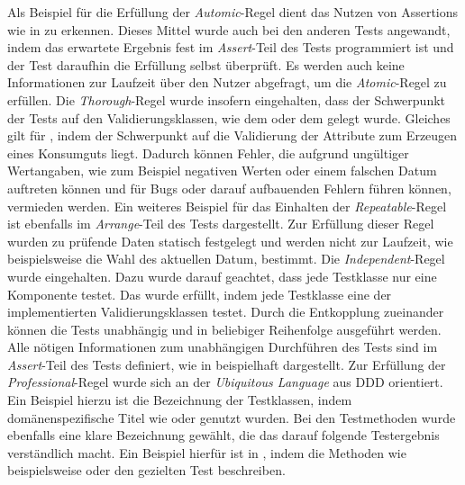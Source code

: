 Als Beispiel für die Erfüllung der \textit{Automic}-Regel dient das Nutzen von Assertions wie in \href{}{} zu erkennen.
Dieses Mittel wurde auch bei den anderen Tests angewandt, indem das erwartete Ergebnis fest im \textit{Assert}-Teil des Tests programmiert ist und der Test daraufhin die Erfüllung selbst überprüft.
Es werden auch keine Informationen zur Laufzeit über den Nutzer abgefragt, um die \textit{Atomic}-Regel zu erfüllen.
Die \textit{Thorough}-Regel wurde insofern eingehalten, dass der Schwerpunkt der Tests auf den Validierungsklassen, wie dem \href{}{} oder dem \href{}{} gelegt wurde.
Gleiches gilt für \href{}{}, indem der Schwerpunkt auf die Validierung der Attribute zum Erzeugen eines Konsumguts liegt.
Dadurch können Fehler, die aufgrund ungültiger Wertangaben, wie zum Beispiel negativen Werten oder einem falschen Datum auftreten können und für Bugs oder darauf aufbauenden Fehlern führen können, vermieden werden.
Ein weiteres Beispiel für das Einhalten der \textit{Repeatable}-Regel ist ebenfalls im \textit{Arrange}-Teil des Tests \href{}{} dargestellt.
Zur Erfüllung dieser Regel wurden zu prüfende Daten statisch festgelegt und werden nicht zur Laufzeit, wie beispielsweise die Wahl des aktuellen Datum, bestimmt.
Die \textit{Independent}-Regel wurde eingehalten. Dazu wurde darauf geachtet, dass jede Testklasse nur eine Komponente testet.
Das wurde erfüllt, indem jede Testklasse eine der implementierten Validierungsklassen testet.
Durch die Entkopplung zueinander können die Tests unabhängig und in beliebiger Reihenfolge ausgeführt werden.
Alle nötigen Informationen zum unabhängigen Durchführen des Tests sind im \textit{Assert}-Teil des Tests definiert, wie in \href{}{} beispielhaft dargestellt.
Zur Erfüllung der \textit{Professional}-Regel wurde sich an der \textit{Ubiquitous Language} aus \ac{DDD} orientiert. Ein Beispiel hierzu ist die Bezeichnung der Testklassen, indem domänenspezifische Titel wie \href{}{} oder \href{}{} genutzt wurden.
Bei den Testmethoden wurde ebenfalls eine klare Bezeichnung gewählt, die das darauf folgende Testergebnis verständlich macht.
Ein Beispiel hierfür ist in \href{}{}, indem die Methoden wie beispielsweise \href{}{} oder \href{}{} den gezielten Test beschreiben.

